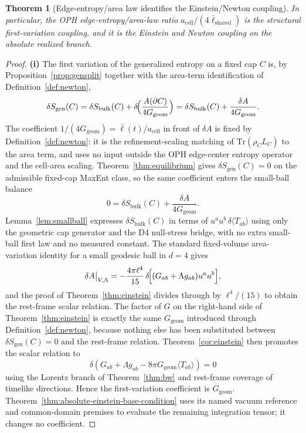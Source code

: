 \documentclass[11pt]{article}
\newtheorem{theorem}{Theorem}[section]
\begin{document}
\begin{theorem}[Edge-entropy/area law identifies the Einstein/Newton coupling]
In particular, the OPH edge-entropy/area-law ratio
\(a_{\mathrm{cell}}/(4\bar\ell_{\mathrm{shared}})\) is the structural
first-variation coupling, and it is the Einstein and Newton coupling on the
absolute realized branch.
\end{theorem}

\begin{proof}
\textbf{(i)} The first variation of the generalized entropy on a fixed cap \(C\) is, by Proposition~\ref{prop:gensplit} together with the area-term identification of Definition~\ref{def:newton},
\[
\delta S_{\mathrm{gen}}(C)
=\delta S_{\mathrm{bulk}}(C)
+\delta\!\Bigl(\frac{A(\partial C)}{4G_{\mathrm{geom}}}\Bigr)
=\delta S_{\mathrm{bulk}}(C)+\frac{\delta A}{4G_{\mathrm{geom}}}.
\]
The coefficient \(1/(4G_{\mathrm{geom}})=\bar\ell(t)/a_{\mathrm{cell}}\) in front of \(\delta A\) is fixed by Definition~\ref{def:newton}: it is the refinement-scaling matching of \(\mathrm{Tr}(\rho_C L_C)\) to the area term, and uses no input outside the OPH edge-center entropy operator and the cell-area scaling. Theorem~\ref{thm:equilibrium} gives \(\delta S_{\mathrm{gen}}(C)=0\) on the admissible fixed-cap MaxEnt class, so the same coefficient enters the small-ball balance
\[
0=\delta S_{\mathrm{bulk}}(C)+\frac{\delta A}{4G_{\mathrm{geom}}}.
\]
Lemma~\ref{lem:smallball} expresses \(\delta S_{\mathrm{bulk}}(C)\) in terms of \(u^au^b\,\delta\langle T_{ab}\rangle\) using only the geometric cap generator and the D4 null-stress bridge, with no extra small-ball first law and no measured constant. The standard fixed-volume area-variation identity for a small geodesic ball in \(d=4\) gives
\[
\delta A\big|_{V,\Lambda}=-\frac{4\pi\ell^4}{15}\,\delta\!\Bigl[(G_{ab}+\Lambda g_{ab})u^au^b\Bigr],
\]
and the proof of Theorem~\ref{thm:einstein} divides through by
\(\ell^4/(15)\) to obtain the rest-frame scalar relation. The factor of
\(G\) on the right-hand side of Theorem~\ref{thm:einstein} is exactly the
same \(G_{\mathrm{geom}}\) introduced through Definition~\ref{def:newton},
because nothing else has been substituted between
\(\delta S_{\mathrm{gen}}(C)=0\) and the rest-frame relation.
Theorem~\ref{cor:einstein} then promotes the scalar relation to
\[
\delta\!\left(G_{ab}+\Lambda g_{ab}
-8\pi G_{\mathrm{geom}}\langle T_{ab}\rangle\right)=0
\]
using the Lorentz branch of Theorem~\ref{thm:bw} and rest-frame coverage of
timelike directions. Hence the first-variation coefficient is
\(G_{\mathrm{geom}}\). Theorem~\ref{thm:absolute-einstein-base-condition}
uses its named vacuum reference and common-domain premises to evaluate the
remaining integration tensor; it changes no coefficient.


\end{proof}
\end{document}
